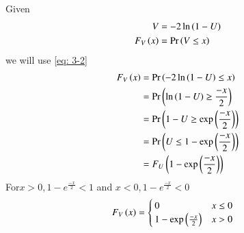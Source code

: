 \documentclass[journal,12pt,twocolumn]{IEEEtran}
\renewcommand\thesection{\arabic{section}}
\begin{document}
\begin{enumerate}[label=\thesection.\arabic*,ref=\thesection.\theenumi]
\solution Given 
\begin{align}
	V &= -2\ln\left(1-U\right)\\ \label{eq: 3-2}
	 F_V\left(x\right) &= \Pr\left(V\leq x\right)
\end{align}
 we will use \eqref{eq: 3-2}
 \begin{align}
	 F_V\left(x\right) &= \Pr\left(-2\ln\left(1-U\right) \leq x\right)\\
	             &= \Pr\left( \ln\left(1-U\right) \geq \frac{-x}{2}\right)\\
		         &= \Pr\left(  1-U \geq \exp\left(\frac{-x}{2}\right)\right)\\
		         &= \Pr\left( U \leq 1 - \exp\left(\frac{-x}{2}\right)\right)\\
                 &= F_U\left(1-\exp\left(\frac{-x}{2}\right)\right)
 \end{align}
  For$ x > 0, 1 - e^{\frac{-x}{2}} < 1$ and $x<0 , 1 - e^{\frac{-x}{2}} < 0 $ 		
 \begin{align}
	 F_V\left(x\right) &=
	           \begin{cases}
			                0  & x\leq 0 \\
		            1-\exp\left(\frac{-x}{2}\right) & x >0	   
                   \end{cases}
 \end{align}		   
%

\end{enumerate}
\end{document}
